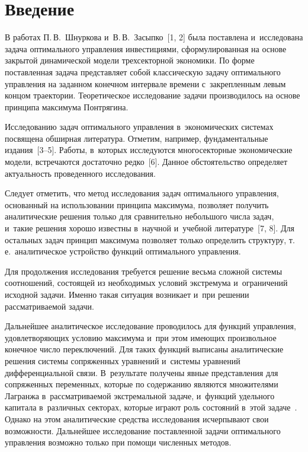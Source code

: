 

\vspace*{3pt}



\thispagestyle{headings}

\begin{multicols}{2}

\label{st\stat}


\section{Введение}

В работах П.\,В.~Шнуркова и~В.\,В.~Засыпко~[1, 2] была поставлена и~исследована задача 
оптимального управ\-ле\-ния инвестициями, сформулированная на основе закрытой динамической 
модели трехсекторной экономики. По форме поставленная задача представляет собой 
классическую задачу оптимального управ\-ле\-ния на заданном конечном интервале времени 
с~закрепленным левым концом траектории. Теоретическое исследование задачи производилось 
на основе принципа максимума Понтря\-гина.
{ %

}

Исследованию задач оптимального управ\-ле\-ния в~экономических системах посвящена 
обширная литература. Отметим, например, фундаментальные издания~[3--5]. Работы, 
в~которых исследуются многосекторные экономические модели, встречаются достаточно 
редко~[6]. Данное обстоятельство определяет актуальность проведенного исследо\-вания.

Следует отметить, что метод исследования задач оптимального управ\-ле\-ния, основанный на 
использовании принципа максимума, позволяет получить аналитические решения только для 
сравнительно небольшого числа задач, и~такие решения хорошо известны в~научной 
и~учебной литературе~[7, 8]. Для остальных задач принцип максимума позволяет только 
определить структуру, т.\,е.\ аналитическое устройство функций оптимального управ\-ле\-ния. 

Для продолжения исследования требуется решение весьма сложной системы соотношений, 
состоящей из необходимых условий экстремума и~ограничений исходной задачи. Именно 
такая ситуация возникает и~при решении рассматриваемой задачи.

 Дальнейшее аналитическое исследование проводилось для функций управ\-ле\-ния, 
 удовлетворяющих условию максимума и~при этом имеющих произвольное конечное число 
 переключений. Для таких функций выписаны аналитические решения системы сопряженных 
 уравнений и~системы уравнений дифференциальной связи. В~результате получены явные 
 представления для сопряженных переменных, которые по содержанию являются множителями 
 Лагранжа в~рассматриваемой экстремальной задаче, и~функций удельного капитала 
 в~различных секторах, которые играют роль состояний в~этой задаче~\cite{1-gor}. 
 Однако на этом аналитические средства исследования исчерпывают свои возможности. 
 Дальнейшее исследование по\-став\-лен\-ной задачи оптимального управ\-ле\-ния возможно только 
 при помощи численных методов.


\end{multicols}
